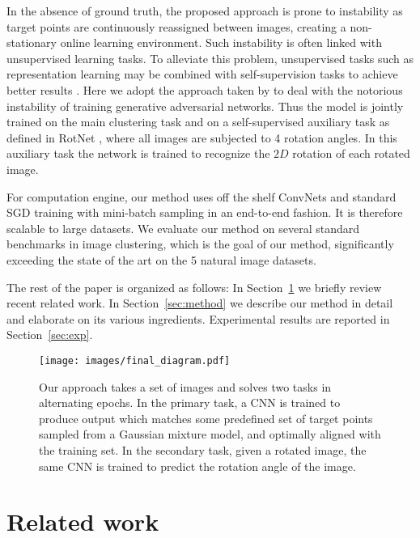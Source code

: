 \documentclass[a4paper,conference]{IEEEtran}
\begin{document}
In the absence of ground truth, the proposed approach is prone to instability as target points are continuously reassigned between images, creating a non-stationary online learning environment. Such instability is often linked with unsupervised learning tasks. To alleviate this problem, unsupervised tasks such as representation learning may be combined with self-supervision tasks to achieve better results \cite{doersch2017multi}. Here we adopt the approach taken by \cite{chen2018ssgan} to deal with the notorious instability of training generative adversarial networks. Thus the model is jointly trained on the main clustering task and on a self-supervised auxiliary task as defined in RotNet \cite{gidaris2018unsupervised}, where all images are subjected to 4 rotation angles. In this auxiliary task the network is trained to recognize the $2D$ rotation of each rotated image. 

For computation engine, our method uses off the shelf ConvNets and standard SGD training with mini-batch sampling in an end-to-end fashion. It is therefore scalable to large datasets. We evaluate our method on several standard benchmarks in image clustering, which is the goal of our method, significantly exceeding the state of the art on the 5 natural image datasets.

The rest of the paper is organized as follows: In Section~\ref{sec:related} we briefly review recent related work. In Section~\ref{sec:method} we describe our method in detail and elaborate on its various ingredients. Experimental results are reported in Section~\ref{sec:exp}.

\begin{figure*}[t]
\begin{center}
    \texttt{[image: images/final\_diagram.pdf]}
\end{center}
   \caption{Our approach takes a set of images and solves two tasks in alternating epochs. In the primary task, a CNN is trained to produce output which matches some predefined set of target points sampled from a Gaussian mixture model, and optimally aligned with the training set. In the secondary task, given a rotated image, the same CNN is trained to predict the rotation angle of the image. }
\label{fig:short}
\end{figure*}

\section{Related work}
\label{sec:related}
\end{document}
